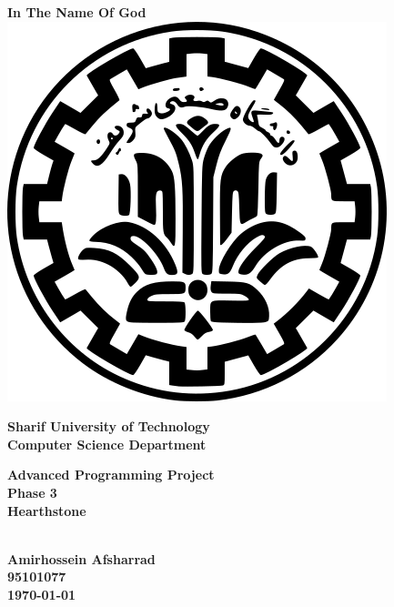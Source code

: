 \documentclass[a4paper]{article}
\begin{document}
	
\begin{titlepage}
	
	\begin{center}
		\textbf{
			In The Name Of God\\
		}
		\vspace{2cm}
		\includegraphics[scale=0.25]{logo.png}\\
		\vspace{0.5cm}
		\begin{Large}
			\textbf{
				Sharif University of Technology\\
				\vspace{0.5cm}
				Computer Science Department\\
			}
		\end{Large}
		\vspace{2.5cm}
		\begin{huge}
			\textbf{
				Advanced Programming Project\\
				 Phase 3\\
				\vspace{1cm}
				Hearthstone\\
			}
		\end{huge}
		\vspace{1.5cm}
		\begin{Large}
			\textbf{
				\\
				\vspace{1cm}
				Amirhossein Afsharrad\\
				\vspace{0.5cm}
				95101077\\
				\vspace{2cm}
				\today
			}
		\end{Large}
		
	\end{center}
	
	\thispagestyle{empty}
\end{titlepage}	
\end{document}
